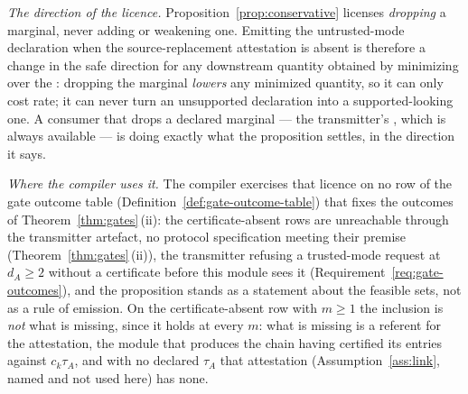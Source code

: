 
\begin{remark}\label{rem:notfallback}
\emph{The direction of the licence.} Proposition~\ref{prop:conservative}
licenses \emph{dropping} a marginal, never adding or weakening one. Emitting
the untrusted-mode declaration when the source-replacement attestation is
absent is therefore a change in the safe direction for any downstream quantity
obtained by minimizing over the : dropping the marginal
\emph{lowers} any minimized quantity, so it can only cost rate; it can never
turn an unsupported declaration into a supported-looking one. A consumer that
drops a declared marginal --- the transmitter's ,
which is always available --- is doing exactly what the proposition settles,
in the direction it says.

\emph{Where the compiler uses it.} The compiler exercises that licence on no
row of the gate outcome table (Definition~\ref{def:gate-outcome-table}) that
fixes the outcomes of Theorem~\ref{thm:gates}\,(ii): the
certificate-absent rows are unreachable through the transmitter artefact, no
protocol specification meeting their premise (Theorem~\ref{thm:gates}\,(ii)),
the transmitter refusing a trusted-mode request at $d_A\ge2$ without a
certificate before this module sees it (Requirement~\ref{req:gate-outcomes}),
and the proposition stands as a statement about
the feasible sets, not as a rule of emission. On the certificate-absent row
with $m\ge1$ the inclusion is \emph{not} what is missing, since it holds at
every $m$: what is missing is a referent for the attestation, the module that
produces the chain having certified its entries against $c_k\tau_A$, and with
no declared $\tau_A$ that attestation (Assumption~\ref{ass:link}, named and
not used here) has none.


\end{remark}
